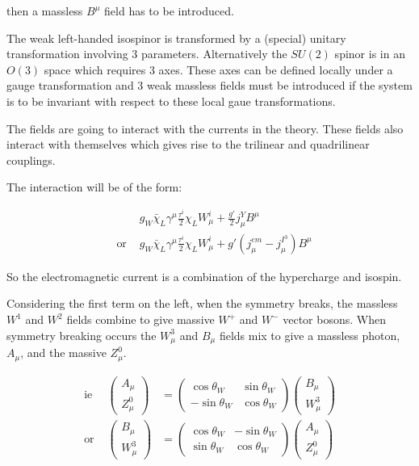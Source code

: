 then a massless $B^{\mu}$ field has to be introduced.

The weak left-handed isospinor is transformed by a (special) unitary transformation involving $3$ parameters.  Alternatively the $SU(2)$ spinor is in an $O(3)$ space which requires $3$ axes.  These axes can be defined locally under a gauge transformation and $3$ weak massless fields must be introduced if the system is to be invariant with respect to these local gaue transformations.

The fields are going to interact with the currents in the theory.  These fields also interact with themselves which gives rise to the trilinear and quadrilinear couplings.

The interaction will be of the form:

\begin{eqnarray*}
  && g_W\bar{\chi}_L\gamma^{\mu}\frac{\tau^i}{2}\chi_L W^i_{\mu} + \frac{g'}{2}j^Y_{\mu}B^{\mu} \\
  & \textrm{or } & g_W\bar{\chi}_L\gamma^{\mu}\frac{\tau^i}{2}\chi_L W^i_{\mu} + g'\left(j^{em}_{\mu} - j^{I^3}_{\mu}\right)B^{\mu}
\end{eqnarray*}

So the electromagnetic current is a combination of the hypercharge and isospin.

Considering the first term on the left, when the symmetry breaks, the massless $W^1$ and $W^2$ fields combine to give massive $W^+$ and $W^-$ vector bosons.  When symmetry breaking occurs the $W^3_{\mu}$ and $B_{\mu}$ fields mix to give a massless photon, $A_{\mu}$, and the massive $Z^0_{\mu}$.

\begin{eqnarray*}
  \textrm{ie } &
  \left(
  \begin{array}{c}
    A_{\mu} \\
    Z^0_{\mu}
  \end{array}
  \right)
  & =
  \left(
  \begin{array}{cc}
     \cos\theta_W & \sin\theta_W \\
    -\sin\theta_W & \cos\theta_W
  \end{array}
  \right)
  \left(
  \begin{array}{c}
    B_{\mu} \\
    W^3_{\mu}
  \end{array}
  \right)
  \\
  \textrm{or } &
  \left(
  \begin{array}{c}
    B_{\mu} \\
    W^3_{\mu}
  \end{array}
  \right)
  & =
  \left(
  \begin{array}{cc}
    \cos\theta_W & -\sin\theta_W \\
    \sin\theta_W &  \cos\theta_W
  \end{array}
  \right)
  \left(
  \begin{array}{c}
    A_{\mu} \\
    Z^0_{\mu}
  \end{array}
  \right)
\end{eqnarray*}

